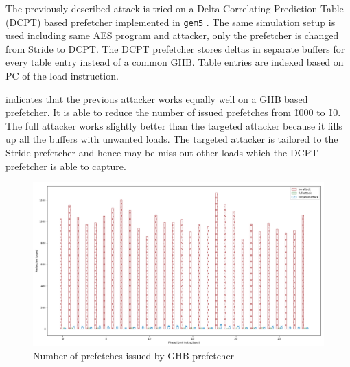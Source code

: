 The previously described attack is tried on a Delta Correlating Prediction Table
(DCPT)  based prefetcher implemented in \texttt{gem5} .
The same simulation setup is used including same AES program and attacker, only
the prefetcher is changed from Stride to DCPT.
The DCPT prefetcher stores deltas in separate buffers for every table entry instead
of a common GHB. Table entries are indexed based on PC of the load instruction.

 indicates that the previous attacker works equally well on
a GHB based prefetcher. It is able to reduce the number of issued prefetches from \~1000
to \~10. The full attacker works slightly better than the targeted attacker because
it fills up all the buffers with unwanted loads. The targeted attacker is tailored to
the Stride prefetcher and hence may be miss out other loads which the DCPT prefetcher
is able to capture.

\begin{figure}[h]
    \centering
    \includegraphics[width=\textwidth]{figures/dcpt-hwpf}
    \caption{Number of prefetches issued by GHB prefetcher}
    \label{fig:targeted_dcpt}
\end{figure}

